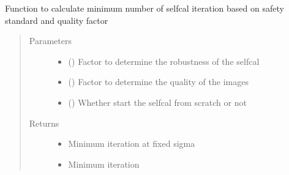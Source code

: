 \documentclass[letterpaper,10pt,english]{sphinxmanual}
\begin{document}
\begin{fulllineitems}
\begin{fulllineitems}
\begin{quote}
\begin{description}
\end{description}\end{quote}

\end{fulllineitems}


\begin{fulllineitems}
\label{\detokenize{paircars:paircars.fullpol_selfcal_LTS.PolSelfcal.calc_iter_num}}
\sphinxAtStartPar
Function to calculate minimum number of selfcal iteration based on safety standard and quality factor
\begin{quote}\begin{description}
\item[{Parameters}] \leavevmode\begin{itemize}
\item {} 
\sphinxAtStartPar
{} () \textendash{} Factor to determine the robustness of the selfcal

\item {} 
\sphinxAtStartPar
{} () \textendash{} Factor to determine the quality of the images

\item {} 
\sphinxAtStartPar
{} () \textendash{} Whether start the selfcal from scratch or not

\end{itemize}

\item[{Returns}] \leavevmode
\sphinxAtStartPar
\begin{itemize}
\item {} 
\sphinxAtStartPar
{} \textendash{} Minimum iteration at fixed sigma

\item {} 
\sphinxAtStartPar
{} \textendash{} Minimum iteration


\end{itemize}
\end{description}
\end{quote}
\end{fulllineitems}
\end{fulllineitems}
\end{document}
